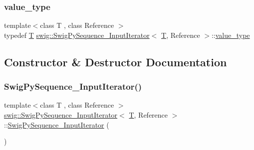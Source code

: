 \subsubsection{\texorpdfstring{value\+\_\+type}{value\_type}}
{\footnotesize\ttfamily template$<$class T , class Reference $>$ \\
typedef \hyperlink{fmt_8h_a0acb682b8260ab1c60b918599864e2e5}{T} \hyperlink{structswig_1_1_swig_py_sequence___input_iterator}{swig\+::\+Swig\+Py\+Sequence\+\_\+\+Input\+Iterator}$<$ \hyperlink{fmt_8h_a0acb682b8260ab1c60b918599864e2e5}{T}, Reference $>$\+::\hyperlink{structswig_1_1_swig_py_sequence___input_iterator_ad7b3ca8f977dda776f80b7c2099cae2f}{value\+\_\+type}}



\subsection{Constructor \& Destructor Documentation}
\mbox{\label{structswig_1_1_swig_py_sequence___input_iterator_a8ae3851215e27042c732e2ee1134e153}} 
\subsubsection{\texorpdfstring{Swig\+Py\+Sequence\+\_\+\+Input\+Iterator()}{SwigPySequence\_InputIterator()}\hspace{0.1cm}{\footnotesize\ttfamily [1/2]}}
{\footnotesize\ttfamily template$<$class T , class Reference $>$ \\
\hyperlink{structswig_1_1_swig_py_sequence___input_iterator}{swig\+::\+Swig\+Py\+Sequence\+\_\+\+Input\+Iterator}$<$ \hyperlink{fmt_8h_a0acb682b8260ab1c60b918599864e2e5}{T}, Reference $>$\+::\hyperlink{structswig_1_1_swig_py_sequence___input_iterator}{Swig\+Py\+Sequence\+\_\+\+Input\+Iterator} (\begin{DoxyParamCaption}{ }\end{DoxyParamCaption})\hspace{0.3cm}{\ttfamily [inline]}}

\mbox{\label{structswig_1_1_swig_py_sequence___input_iterator_a4c4588a112b05a77b096d5fc87d04d67}} 
